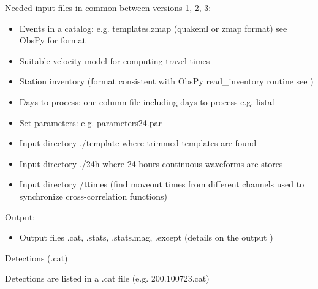 \documentclass[a4paper,10pt,english]{sphinxmanual}
\begin{document}
Needed input files in common between versions 1, 2, 3:
\begin{itemize}
\item {} 
Events in a catalog: e.g. templates.zmap (quakeml or zmap format) see ObsPy for format

\item {} 
Suitable velocity model for computing travel times

\item {} 
Station inventory (format consistent with ObsPy read\_inventory routine see )

\item {} 
Days to process: one column file including days to process e.g. lista1

\item {} 
Set parameters: e.g. parameters24.par

\item {} 
Input directory ./template where trimmed templates are found

\item {} 
Input directory ./24h where 24 hours continuous waveforms are stores

\item {} 
Input directory /ttimes (find moveout times from different channels used to synchronize cross-correlation functions)

\end{itemize}

Output:
\begin{itemize}
\item {} 
Output files .cat, .stats, .stats.mag, .except (details on the output )

\end{itemize}

Detections (.cat)

Detections are listed in a .cat file (e.g. 200.100723.cat)
\end{document}
